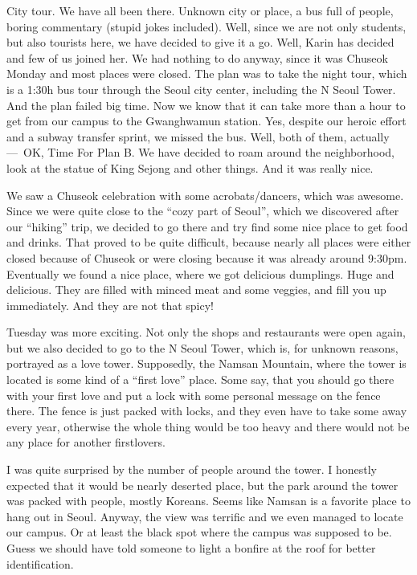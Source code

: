 \begin{post}
	\begin{content}
City tour. We have all been there. Unknown city or place, a bus full of people, boring commentary (stupid jokes included). Well, since we are not only students, but also tourists here, we have decided to give it a go. Well, Karin has decided and few of us joined her. We had nothing to do anyway, since it was Chuseok Monday and most places were closed. The plan was to take the night tour, which is a 1:30h bus tour through the Seoul city center, including the N Seoul Tower. And the plan failed big time. Now we know that it can take more than a hour to get from our campus to the Gwanghwamun station. Yes, despite our heroic effort and a subway transfer sprint, we missed the bus. Well, both of them, actually --- OK, Time For Plan B. We have decided to roam around the neighborhood, look at the statue of King Sejong and other things. And it was really nice.

We saw a Chuseok celebration with some acrobats/dancers, which was awesome. Since we were quite close to the ``cozy part of Seoul'', which we discovered after our ``hiking'' trip, we decided to go there and try find some nice place to get food and drinks. That proved to be quite difficult, because nearly all places were either closed because of Chuseok or were closing because it was already around 9:30pm. Eventually we found a nice place, where we got delicious dumplings. Huge and delicious. They are filled with minced meat and some veggies, and fill you up immediately. And they are not that spicy!

Tuesday was more exciting. Not only the shops and restaurants were open again, but we also decided to go to the N Seoul Tower, which is, for unknown reasons, portrayed as a love tower. Supposedly, the Namsan Mountain, where the tower is located is some kind of a ``first love'' place. Some say, that you should go there with your first love and put a lock with some personal message on the fence there. The fence is just packed with locks, and they even have to take some away every year, otherwise the whole thing would be too heavy and there would not be any place for another firstlovers.

I was quite surprised by the number of people around the tower. I honestly expected that it would be nearly deserted place, but the park around the tower was packed with people, mostly Koreans. Seems like Namsan is a favorite place to hang out in Seoul. Anyway, the view was terrific and we even managed to locate our campus. Or at least the black spot where the campus was supposed to be. Guess we should have told someone to light a bonfire at the roof for better identification.


\end{content}
\end{post}
